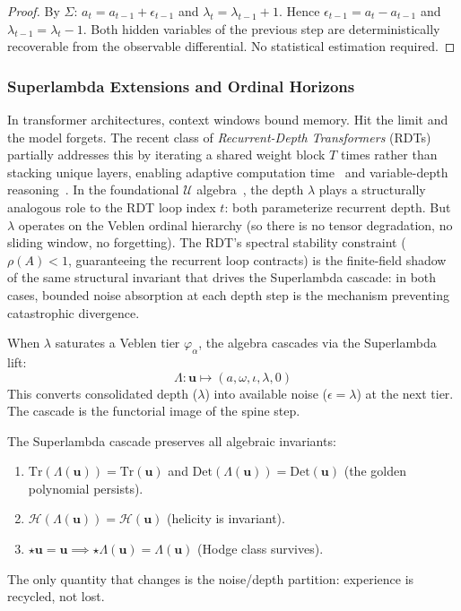 \begin{proof}
By $\Sigma$: $a_t = a_{t-1} + \epsilon_{t-1}$ and $\lambda_t = \lambda_{t-1} + 1$. Hence $\epsilon_{t-1} = a_t - a_{t-1}$ and $\lambda_{t-1} = \lambda_t - 1$. Both hidden variables of the previous step are deterministically recoverable from the observable differential. No statistical estimation required. \qedhere
\end{proof}

\subsubsection{Superlambda Extensions and Ordinal Horizons}

In transformer architectures, context windows bound memory. Hit the limit and the model forgets. The recent class of \emph{Recurrent-Depth Transformers} (RDTs) partially addresses this by iterating a shared weight block $T$ times rather than stacking unique layers, enabling adaptive computation time~\cite{Graves2016ACT} and variable-depth reasoning~\cite{Dehghani2019UT,Bae2024RRT}. In the foundational $\mathcal{U}$ algebra~\cite{larue_lc}, the depth $\lambda$ plays a structurally analogous role to the RDT loop index $t$: both parameterize recurrent depth. But $\lambda$ operates on the Veblen ordinal hierarchy (so there is no tensor degradation, no sliding window, no forgetting). The RDT's spectral stability constraint ($\rho(A) < 1$, guaranteeing the recurrent loop contracts) is the finite-field shadow of the same structural invariant that drives the Superlambda cascade: in both cases, bounded noise absorption at each depth step is the mechanism preventing catastrophic divergence.

\begin{definition}
When $\lambda$ saturates a Veblen tier $\varphi_\alpha$, the algebra cascades via the Superlambda lift:
$$\Lambda : \mathbf{u} \mapsto (a, \omega, \iota, \lambda, 0)$$
This converts consolidated depth ($\lambda$) into available noise ($\epsilon = \lambda$) at the next tier. The cascade is the functorial image of the spine step.
\end{definition}

\begin{theorem}
The Superlambda cascade preserves all algebraic invariants:
\begin{enumerate}
\item $\mathrm{Tr}(\Lambda(\mathbf{u})) = \mathrm{Tr}(\mathbf{u})$ and $\mathrm{Det}(\Lambda(\mathbf{u})) = \mathrm{Det}(\mathbf{u})$ (the golden polynomial persists).
\item $\mathcal{H}(\Lambda(\mathbf{u})) = \mathcal{H}(\mathbf{u})$ (helicity is invariant).
\item $\star \mathbf{u} = \mathbf{u} \implies \star \Lambda(\mathbf{u}) = \Lambda(\mathbf{u})$ (Hodge class survives).
\end{enumerate}
The only quantity that changes is the noise/depth partition: experience is recycled, not lost.
\end{theorem}

